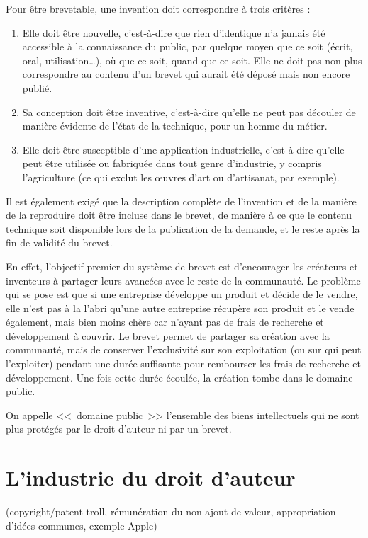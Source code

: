 Pour être brevetable, une invention doit correspondre à trois critères :
\begin{enumerate}
\item Elle doit être nouvelle, c'est-à-dire que rien d'identique n'a jamais été accessible à la connaissance du public, par quelque moyen que ce soit (écrit, oral, utilisation\dots{}), où que ce soit, quand que ce soit. Elle ne doit pas non plus correspondre au contenu d'un brevet qui aurait été déposé mais non encore publié.
\item Sa conception doit être inventive, c'est-à-dire qu'elle ne peut pas découler de manière évidente de l'état de la technique, pour un homme du métier.
\item Elle doit être susceptible d'une application industrielle, c'est-à-dire qu'elle peut être utilisée ou fabriquée dans tout genre d'industrie, y compris l'agriculture (ce qui exclut les œuvres d'art ou d'artisanat, par exemple).
\end{enumerate}\bigskip

Il est également exigé que la description complète de l'invention et de la manière de la reproduire doit être incluse dans le brevet, de manière à ce que le contenu technique soit disponible lors de la publication de la demande, et le reste après la fin de validité du brevet.

En effet, l'objectif premier du système de brevet est d'encourager les créateurs et inventeurs à partager leurs avancées avec le reste de la communauté.
Le problème qui se pose est que si une entreprise développe un produit et décide de le vendre, elle n'est pas à la l'abri qu'une autre entreprise récupère son produit et le vende également, mais bien moins chère car n'ayant pas de frais de recherche et développement à couvrir.
Le brevet permet de partager sa création avec la communauté, mais de conserver l'exclusivité sur son exploitation (ou sur qui peut l'exploiter) pendant une durée suffisante pour rembourser les frais de recherche et développement.
Une fois cette durée écoulée, la création tombe dans le domaine public.

On appelle <<~domaine public~>> l'ensemble des biens intellectuels qui ne sont plus protégés par le droit d'auteur ni par un brevet.

\section{L'industrie du droit d'auteur}
(copyright/patent troll, rémunération du non-ajout de valeur, appropriation d'idées communes, exemple Apple)
